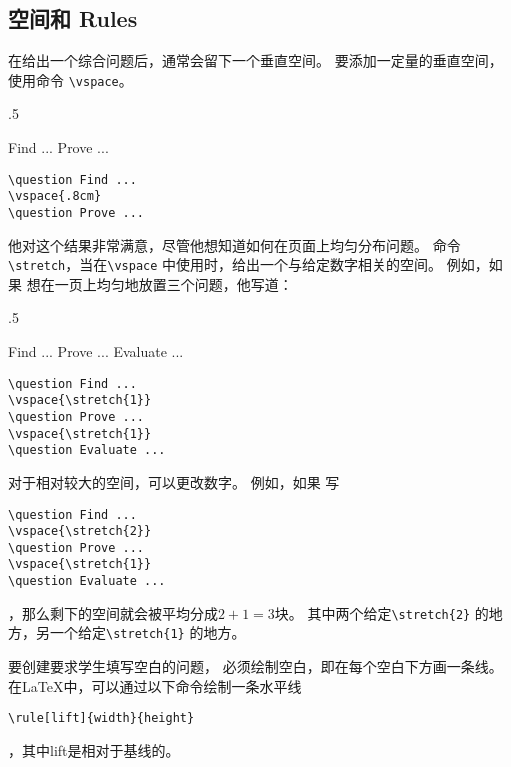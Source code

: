 \subsection{空间和 Rules}
在给出一个综合问题后，通常会留下一个垂直空间。 要添加一定量的垂直空间，\raul{} 使用命令 \verb=\vspace=。
\begin{miniexammar}{.5\textandmarginlen}{
\begin{exampaper}
\question Find ...
\vspace{.8cm}
\question Prove ...
\end{exampaper}
}
\begin{lstlisting}
\question Find ...
\vspace{.8cm}
\question Prove ...
\end{lstlisting}
\end{miniexammar}

他对这个结果非常满意，尽管他想知道如何在页面上均匀分布问题。 命令\verb=\stretch=，当在\verb=\vspace= 中使用时，给出一个与给定数字相关的空间。 例如，如果 \raul{} 想在一页上均匀地放置三个问题，他写道：
\begin{miniexammar}{.5\textandmarginlen}{
\begin{exampaper}
\question Find ...
\vspace{.5cm}
\question Prove ...
\vspace{.5cm}
\question Evaluate ...
\end{exampaper}
}
\begin{lstlisting}
\question Find ...
\vspace{\stretch{1}}
\question Prove ...
\vspace{\stretch{1}}
\question Evaluate ...
\end{lstlisting}
\end{miniexammar}
对于相对较大的空间，可以更改数字。 例如，如果 \raul{} 写
\begin{lstlisting}
\question Find ...
\vspace{\stretch{2}}
\question Prove ...
\vspace{\stretch{1}}
\question Evaluate ...
\end{lstlisting}
，那么剩下的空间就会被平均分成$2+1=3$块。 其中两个给定\verb=\stretch{2}= 的地方，另一个给定\verb=\stretch{1}= 的地方。

要创建要求学生填写空白的问题，\raul{} 必须绘制空白，即在每个空白下方画一条线。 在\LaTeX{}中，可以通过以下命令绘制一条水平线
\begin{verbatim}
\rule[lift]{width}{height}
\end{verbatim}
，其中lift是相对于基线的。

